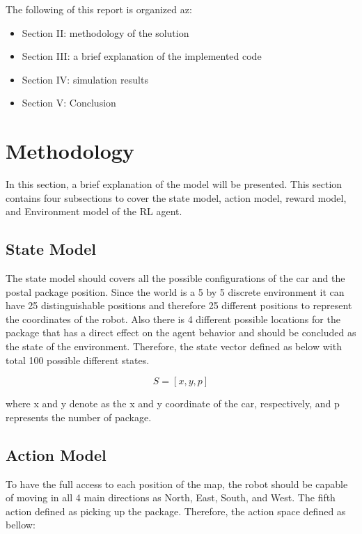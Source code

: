 \documentclass[lettersize,journal]{IEEEtran}
\begin{document}
The following of this report is organized az:
\begin{itemize}
    \item Section II: methodology of the solution
    \item Section III: a brief explanation of the implemented code
    \item Section IV: simulation results
    \item Section V: Conclusion
\end{itemize}
\vspace{0.3cm}


\section{Methodology}
In this section, a brief explanation of the model will be presented. This section contains four subsections to cover the state model, action model, reward model, and Environment model of the RL agent.\par

\subsection{State Model}
The state model should covers all the possible configurations of the car and the postal package position. Since the world is a 5 by 5 discrete environment it can have 25 distinguishable positions and therefore 25 different positions to represent the coordinates of the robot. Also there is 4 different possible locations for the package that has a direct effect on the agent behavior and should be concluded as the state of the environment. Therefore, the state vector defined as below with total 100 possible different states.

\begin{equation}
S = [x, y, p]
\end{equation}

where x and y denote as the x and y coordinate of the car, respectively, and p represents the number of package. 

\subsection{Action Model}
To have the full access to each position of the map, the robot should be capable of moving in all 4 main directions as North, East, South, and West. The fifth action defined as picking up the package. Therefore, the action space defined as bellow:
\end{document}
